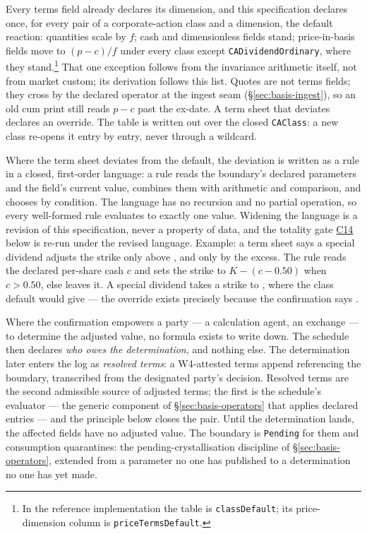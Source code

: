 \begin{description}[style=nextline]
\item[Class default.] Every terms field already declares its dimension, and this specification
declares once, for every pair of a corporate-action class and a dimension, the default reaction:
quantities scale by $f$; cash and dimensionless fields stand; price-in-basis fields move to
$(p-c)/f$ under every class except \texttt{CADividendOrdinary}, where they
stand.\footnote{In the reference implementation the table is
\texttt{classDefault}; its price-dimension column is
\texttt{priceTermsDefault}.} That one exception follows from the invariance
arithmetic itself, not from market custom; its derivation follows this
list. Quotes are not terms
fields; they cross by the declared operator at the ingest seam
(\S\ref{sec:basis-ingest}), so an old cum print still reads $p-c$ past the
ex-date. A term sheet that deviates declares an override. The table is
written out over the closed \texttt{CAClass}: a new class re-opens it entry
by entry, never through a wildcard.
\item[Declared override.] Where the term sheet deviates from the default, the
deviation is written as a rule in a closed, first-order language: a rule reads the
boundary's declared parameters and the field's current value, combines them with
arithmetic and comparison, and chooses by condition. The language has no recursion
and no partial operation, so every well-formed rule evaluates to exactly one
value. Widening the language is a revision of this specification, never a
property of data, and the totality gate \hyperref[cond:C14]{C14} below is
re-run under the revised language. Example: a term sheet says a special dividend
adjusts the strike only above , and only by the excess. The rule reads the
declared per-share cash $c$ and sets the strike to $K - (c - 0.50)$ when $c > 0.50$,
else leaves it. A  special dividend takes a  strike to ,
where the class default would give  --- the override exists precisely
because the confirmation says .
\item[Designated discretion.] Where the confirmation empowers a party --- a
calculation agent, an exchange --- to determine the adjusted value, no formula
exists to write down. The schedule then declares \emph{who owes the
determination}, and nothing else. The determination later enters the log as
\emph{resolved terms}: a W4-attested terms append referencing the boundary,
transcribed from the designated party's decision. Resolved terms are the
second admissible source of adjusted terms; the first is the schedule's
evaluator --- the generic component of \S\ref{sec:basis-operators} that
applies declared entries --- and the principle below closes the pair. Until
the determination lands, the affected fields have no adjusted value. The
boundary is \texttt{Pending} for them and consumption quarantines: the
pending-crystallisation discipline of \S\ref{sec:basis-operators}, extended
from a parameter no one has published to a determination no one has yet
made.
\end{description}

